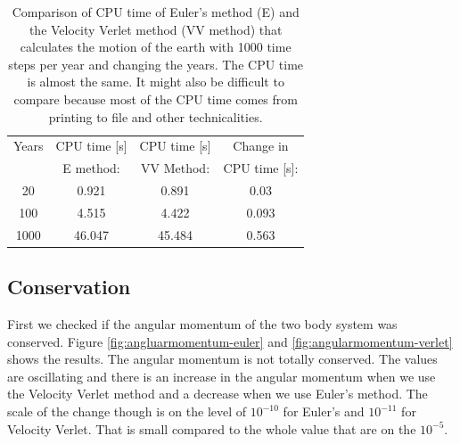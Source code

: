 \begin{table}[H]\caption{Comparison of CPU time of Euler's method (E) and the Velocity Verlet method (VV method) that calculates the motion of the earth with 1000 time steps per year and changing the years. The CPU time is almost the same. It might also be difficult to compare because most of the CPU time comes from printing to file and other technicalities.}\label{tab:CPUtime}
\begin{tabular}[width=\linewidth]{cccc}
Years & \small{CPU time [s]}  & \small{CPU time [s]} & \small{Change in}\\ 
& \small{E method:} & \small{ VV Method}: & \small{CPU time [s]:}\\ \hline
20 & 0.921 & 0.891 & 0.03\\
100 & 4.515 & 4.422 & 0.093\\
1000 & 46.047 & 45.484 & 0.563\\
\end{tabular}
\end{table}

%	

\subsection{Conservation}

First we checked if the angular momentum of the two body system was conserved. Figure \ref{fig:angluarmomentum-euler} and \ref{fig:angularmomentum-verlet} shows the results. The angular momentum is not totally conserved. The values are oscillating and there is an increase in the angular momentum when we use the Velocity Verlet method and a decrease when we use Euler's method. The scale of the change though is on the level of $10^{-10}$ for Euler's and $10^{-11}$ for Velocity Verlet. That is small compared to the whole value that are on the $10^{-5}$.

